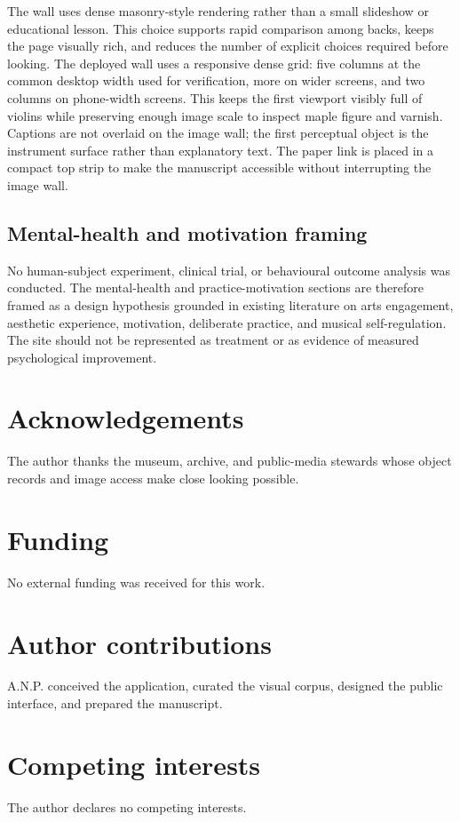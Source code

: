 \documentclass[12pt,letterpaper]{article}
\begin{document}
The wall uses dense masonry-style rendering rather than a small slideshow or educational lesson. This choice supports rapid comparison among backs, keeps the page visually rich, and reduces the number of explicit choices required before looking. The deployed wall uses a responsive dense grid: five columns at the common desktop width used for verification, more on wider screens, and two columns on phone-width screens. This keeps the first viewport visibly full of violins while preserving enough image scale to inspect maple figure and varnish. Captions are not overlaid on the image wall; the first perceptual object is the instrument surface rather than explanatory text. The paper link is placed in a compact top strip to make the manuscript accessible without interrupting the image wall.

\subsection*{Mental-health and motivation framing}

No human-subject experiment, clinical trial, or behavioural outcome analysis was conducted. The mental-health and practice-motivation sections are therefore framed as a design hypothesis grounded in existing literature on arts engagement, aesthetic experience, motivation, deliberate practice, and musical self-regulation. The site should not be represented as treatment or as evidence of measured psychological improvement.

\section*{Acknowledgements}
The author thanks the museum, archive, and public-media stewards whose object records and image access make close looking possible.

\section*{Funding}
No external funding was received for this work.

\section*{Author contributions}
A.N.P. conceived the application, curated the visual corpus, designed the public interface, and prepared the manuscript.

\section*{Competing interests}
The author declares no competing interests.
\end{document}
